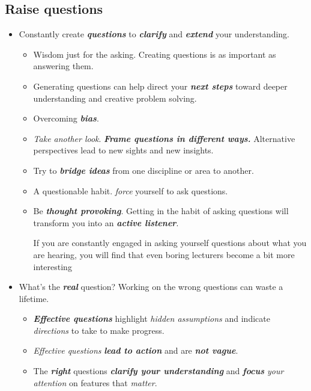 \documentclass[11pt]{article}
\begin{document}
\subsection{Raise questions}
\begin{itemize}
\item Constantly create \emph{\textbf{questions}} to \emph{\textbf{clarify}} and \emph{\textbf{extend}} your understanding. 
\begin{itemize}
\item Wisdom just for the asking. Creating questions is as important as answering them.

\item Generating questions can help direct your \emph{\textbf{next steps}} toward deeper understanding and creative problem solving.

\item Overcoming \emph{\textbf{bias}}.

\item \emph{Take another look}. \emph{\textbf{Frame questions in different ways.}} Alternative perspectives lead to new sights and new insights.

\item Try to \emph{\textbf{bridge ideas}} from one discipline or area to another.

\item A questionable habit. \emph{force} yourself to ask questions.

\item Be \emph{\textbf{thought provoking}}. Getting in the habit of asking questions will transform you into an \emph{\textbf{active listener}}.

If you are constantly engaged in asking yourself questions about what you are hearing, you will find that even boring lecturers become a bit more interesting
\end{itemize}


\item What’s the \emph{\textbf{real}} question? Working on the wrong questions can waste a lifetime.
\begin{itemize}
\item \emph{\textbf{Effective questions}} highlight \emph{hidden assumptions} and indicate \emph{directions} to take to make progress.

\item \emph{Effective questions} \emph{\textbf{lead to action}} and are \emph{\textbf{not vague}}.

\item The \emph{\textbf{right}} questions \emph{\textbf{clarify your understanding}} and \emph{\textbf{focus} your attention} on features that \emph{matter}.


\end{itemize}
\end{itemize}
\end{document}
